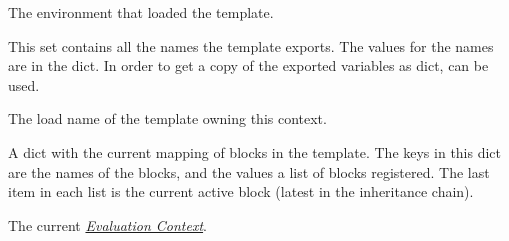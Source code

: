 \documentclass[a4paper,10pt,english]{sphinxmanual}
\begin{document}
\begin{fulllineitems}
\begin{fulllineitems}
\end{fulllineitems}


\begin{fulllineitems}
\label{api:jinja2.Context.environment}
The environment that loaded the template.

\end{fulllineitems}


\begin{fulllineitems}
\label{api:jinja2.Context.exported_vars}
This set contains all the names the template exports.  The values for
the names are in the {\hyperref[api:jinja2.Context.vars]{}} dict.  In order to get a copy of the
exported variables as dict,  can be used.

\end{fulllineitems}


\begin{fulllineitems}
\label{api:jinja2.Context.name}
The load name of the template owning this context.

\end{fulllineitems}


\begin{fulllineitems}
\label{api:jinja2.Context.blocks}
A dict with the current mapping of blocks in the template.  The keys
in this dict are the names of the blocks, and the values a list of
blocks registered.  The last item in each list is the current active
block (latest in the inheritance chain).

\end{fulllineitems}


\begin{fulllineitems}
\label{api:jinja2.Context.eval_ctx}
The current {\hyperref[api:eval-context]{\emph{Evaluation Context}}}.

\end{fulllineitems}


\end{fulllineitems}
\end{document}

